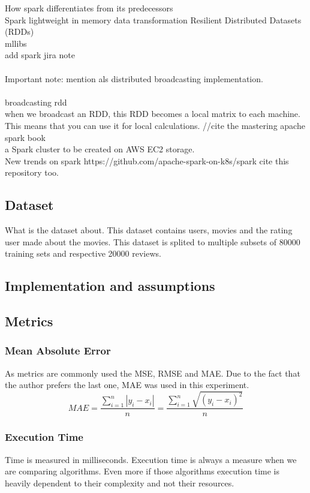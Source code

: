 How spark differentiates from its predecessors\\
Spark lightweight in memory data transformation 
Resilient Distributed Datasets (RDDs) \\
mllibs\\
add spark jira note \\\\
Important note: mention als distributed broadcasting implementation. 
\\\\
broadcasting rdd \\ when we broadcast an RDD, this RDD becomes a local matrix to each machine. This means that you can use it for local calculations.
//cite the mastering apache spark book
\cite{ApacheSpark:1} \\
a Spark cluster to be created on AWS EC2 storage.\\
New trends on spark https://github.com/apache-spark-on-k8s/spark cite this repository too.
\subsection{Dataset}
What is the dataset about. This dataset contains users, movies and the rating user made about the movies.
This dataset is splited to multiple subsets of 80000 training sets and respective 20000 reviews.
\cite{MovieLens:3}

\subsection{Implementation and assumptions}
\subsection{Metrics}
\subsubsection{Mean Absolute Error}
As metrics are commonly used the MSE, RMSE and MAE. Due to the fact that the author prefers the last one, MAE was used in this experiment.
\begin{equation}
MAE = \frac{\sum_{i=1}^{n}{|y_{i}-x_{i}|} }{n} = \frac{\sum_{i=1}^{n}\sqrt{{(y_{i}-x_{i})}^{2}}}{n}
\end{equation}
\subsubsection{Execution Time}
Time is measured in milliseconds.
Execution time is always a measure when we are comparing algorithms. 
Even more if those algorithms execution time is heavily dependent to their complexity and not their resources.

